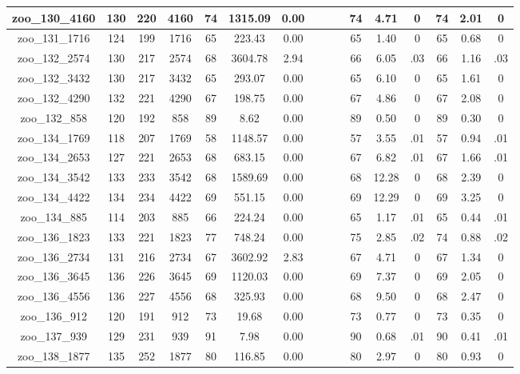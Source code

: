 \begin{landscape}
\begin{longtable}{|c|c|c|c|c|c|c|c|c|c|c|c|c|c|c|c|}
zoo\_130\_4160 & 130 & 220 & 4160 & 74 & 1315.09 & 0.00 &  &  &  & 74 & 4.71 & 0 & 74 & 2.01 & 0 \\ \hline 
zoo\_131\_1716 & 124 & 199 & 1716 & 65 & 223.43 & 0.00 &  &  &  & 65 & 1.40 & 0 & 65 & 0.68 & 0 \\ \hline 
zoo\_132\_2574 & 130 & 217 & 2574 & 68 & 3604.78 & 2.94 &  &  &  & 66 & 6.05 & .03 & 66 & 1.16 & .03 \\ \hline 
zoo\_132\_3432 & 130 & 217 & 3432 & 65 & 293.07 & 0.00 &  &  &  & 65 & 6.10 & 0 & 65 & 1.61 & 0 \\ \hline 
zoo\_132\_4290 & 132 & 221 & 4290 & 67 & 198.75 & 0.00 &  &  &  & 67 & 4.86 & 0 & 67 & 2.08 & 0 \\ \hline 
zoo\_132\_858 & 120 & 192 & 858 & 89 & 8.62 & 0.00 &  &  &  & 89 & 0.50 & 0 & 89 & 0.30 & 0 \\ \hline 
zoo\_134\_1769 & 118 & 207 & 1769 & 58 & 1148.57 & 0.00 &  &  &  & 57 & 3.55 & .01 & 57 & 0.94 & .01 \\ \hline 
zoo\_134\_2653 & 127 & 221 & 2653 & 68 & 683.15 & 0.00 &  &  &  & 67 & 6.82 & .01 & 67 & 1.66 & .01 \\ \hline 
zoo\_134\_3542 & 133 & 233 & 3542 & 68 & 1589.69 & 0.00 &  &  &  & 68 & 12.28 & 0 & 68 & 2.39 & 0 \\ \hline 
zoo\_134\_4422 & 134 & 234 & 4422 & 69 & 551.15 & 0.00 &  &  &  & 69 & 12.29 & 0 & 69 & 3.25 & 0 \\ \hline 
zoo\_134\_885 & 114 & 203 & 885 & 66 & 224.24 & 0.00 &  &  &  & 65 & 1.17 & .01 & 65 & 0.44 & .01 \\ \hline 
zoo\_136\_1823 & 133 & 221 & 1823 & 77 & 748.24 & 0.00 &  &  &  & 75 & 2.85 & .02 & 74 & 0.88 & .02 \\ \hline 
zoo\_136\_2734 & 131 & 216 & 2734 & 67 & 3602.92 & 2.83 &  &  &  & 67 & 4.71 & 0 & 67 & 1.34 & 0 \\ \hline 
zoo\_136\_3645 & 136 & 226 & 3645 & 69 & 1120.03 & 0.00 &  &  &  & 69 & 7.37 & 0 & 69 & 2.05 & 0 \\ \hline 
zoo\_136\_4556 & 136 & 227 & 4556 & 68 & 325.93 & 0.00 &  &  &  & 68 & 9.50 & 0 & 68 & 2.47 & 0 \\ \hline 
zoo\_136\_912 & 120 & 191 & 912 & 73 & 19.68 & 0.00 &  &  &  & 73 & 0.77 & 0 & 73 & 0.35 & 0 \\ \hline 
zoo\_137\_939 & 129 & 231 & 939 & 91 & 7.98 & 0.00 &  &  &  & 90 & 0.68 & .01 & 90 & 0.41 & .01 \\ \hline 
zoo\_138\_1877 & 135 & 252 & 1877 & 80 & 116.85 & 0.00 &  &  &  & 80 & 2.97 & 0 & 80 & 0.93 & 0 \\ \hline 

\end{longtable}
\end{landscape}
